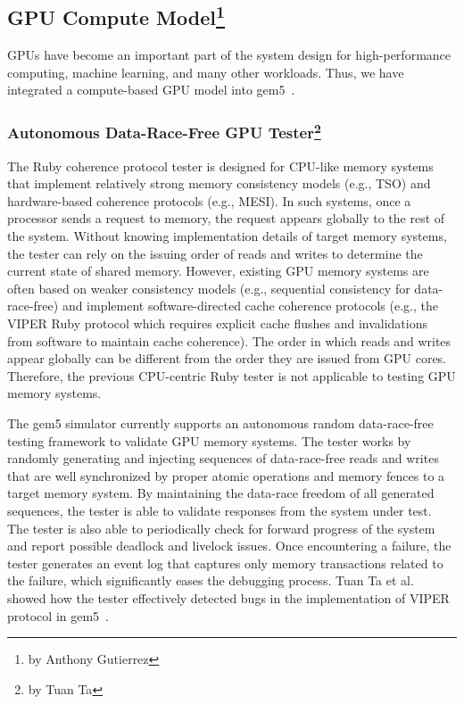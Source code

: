\subsection[GPU Compute Model]{GPU Compute Model\footnote{by Anthony Gutierrez}}
\label{sec:gpu}

GPUs have become an important part of the system design for high-performance computing, machine learning, and many other workloads.
Thus, we have integrated a compute-based GPU model into gem5~\cite{GutierrezBeckmann2018-amdAPU}.

\subsubsection[Autonomous Data-Race-Free GPU Tester]{Autonomous Data-Race-Free GPU Tester\footnote{by Tuan Ta}}

The Ruby coherence protocol tester is designed for CPU-like memory systems that implement relatively strong memory consistency models (e.g., TSO) and hardware-based coherence protocols (e.g., MESI).
In such systems, once a processor sends a request to memory, the request appears globally to the rest of the system.
Without knowing implementation details of target memory systems, the tester can rely on the issuing order of reads and writes to determine the current state of shared memory.
However, existing GPU memory systems are often based on weaker consistency models (e.g., sequential consistency for data-race-free) and implement software-directed cache coherence protocols (e.g., the VIPER Ruby protocol which requires explicit cache flushes and invalidations from software to maintain cache coherence).
The order in which reads and writes appear globally can be different from the order they are issued from GPU cores.
Therefore, the previous CPU-centric Ruby tester is not applicable to testing GPU memory systems.

The gem5 simulator currently supports an autonomous random data-race-free testing framework to validate GPU memory systems.
The tester works by randomly generating and injecting sequences of data-race-free reads and writes that are well synchronized by proper atomic operations and memory fences to a target memory system.
By maintaining the data-race freedom of all generated sequences, the tester is able to validate responses from the system under test.
The tester is also able to periodically check for forward progress of the system and report possible deadlock and livelock issues.
Once encountering a failure, the tester generates an event log that captures only memory transactions related to the failure, which significantly eases the debugging process.
Tuan Ta et al. showed how the tester effectively detected bugs in the implementation of VIPER protocol in gem5~\cite{Ta2019gputesting}.
